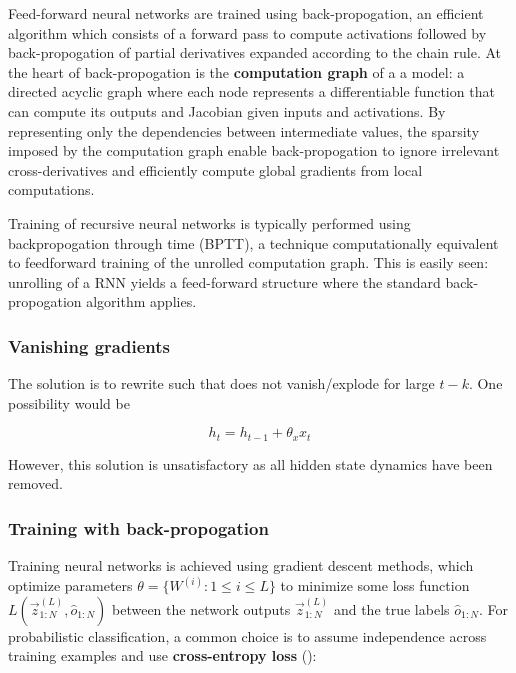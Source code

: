 Feed-forward neural networks are trained using back-propogation, an efficient
algorithm which consists of a forward pass to compute activations followed by
back-propogation of partial derivatives expanded according to the chain
rule. At the heart of back-propogation is the
\textbf{computation graph} of a a model: a directed acyclic graph where each
node represents a differentiable function that can compute its outputs and
Jacobian given inputs and activations. By representing only
the dependencies between intermediate values, the sparsity imposed by the
computation graph enable back-propogation to ignore irrelevant
cross-derivatives and efficiently compute global gradients from local
computations.


Training of recursive neural networks is typically performed using
backpropogation through time (BPTT), a technique computationally
equivalent to feedforward training of the unrolled computation graph. This is
easily seen: unrolling of a RNN yields a feed-forward structure where the
standard back-propogation algorithm applies.




\subsubsection{Vanishing gradients}

The solution is to rewrite  such that
 does not vanish/explode for large $t - k$.
One possibility would be

\begin{equation}
    h_t = h_{t-1} + \theta_x x_t
\end{equation}

However, this solution is unsatisfactory as all hidden state dynamics have been
removed.


\subsubsection{Training with back-propogation}

Training neural networks is achieved using gradient descent methods, which
optimize parameters $\theta = \{W^{(i)} : 1 \leq i \leq L \}$ to minimize some
loss function $L(\vec{z}^{(L)}_{1:N}, \hat{o}_{1:N})$ between the network
outputs $\vec{z}^{(L)}_{1:N}$ and the true labels $\hat{o}_{1:N}$. For
probabilistic classification, a common choice is to assume independence
across training examples and use \textbf{cross-entropy loss}
():


